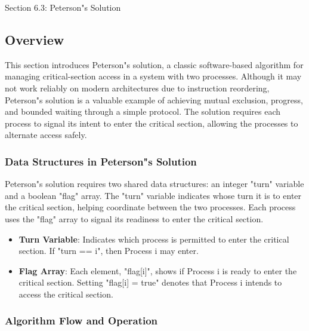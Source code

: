 \begin{notes}{Section 6.3: Peterson"s Solution}
    \subsection*{Overview}

    This section introduces Peterson"s solution, a classic software-based algorithm for managing critical-section access in a system with two processes. Although it may not work reliably on modern 
    architectures due to instruction reordering, Peterson"s solution is a valuable example of achieving mutual exclusion, progress, and bounded waiting through a simple protocol. The solution 
    requires each process to signal its intent to enter the critical section, allowing the processes to alternate access safely.
    
    \subsubsection*{Data Structures in Peterson"s Solution}
    
    Peterson"s solution requires two shared data structures: an integer "turn" variable and a boolean "flag" array. The "turn" variable indicates whose turn it is to enter the critical section, 
    helping coordinate between the two processes. Each process uses the "flag" array to signal its readiness to enter the critical section.
    
    \begin{highlight}
    
        \begin{itemize}
            \item \textbf{Turn Variable}: Indicates which process is permitted to enter the critical section. If "turn == i", then Process i may enter.
            \item \textbf{Flag Array}: Each element, "flag[i]", shows if Process i is ready to enter the critical section. Setting "flag[i] = true" denotes that Process i intends to access the critical section.
        \end{itemize}
    
    \end{highlight}
    
    \subsubsection*{Algorithm Flow and Operation}
    

\end{notes}
